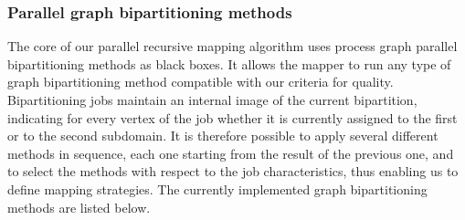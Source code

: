 \subsubsection{Parallel graph bipartitioning methods}
\label{sec-algo-bipart}

The core of our parallel recursive mapping algorithm uses process
graph parallel bipartitioning
methods as black boxes. It allows the mapper to run any type of graph
bipartitioning method compatible with our criteria for quality.
Bipartitioning jobs maintain an internal image of the current bipartition,
indicating for every vertex of the job whether it is currently assigned to the
first or to the second subdomain.
It is therefore possible to apply several different methods in sequence,
each one starting from the result of the previous one,
and to select the methods with respect to the job characteristics, thus
enabling us to define mapping strategies.
The currently implemented graph bipartitioning methods are listed below.
